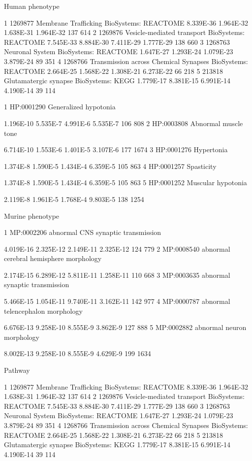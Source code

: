 Human phenotype

1 
1269877 
Membrane Trafficking 
BioSystems: REACTOME 
8.339E-36 
1.964E-32 
1.638E-31 
1.964E-32 
137 
614 
2 
1269876 
Vesicle-mediated transport 
BioSystems: REACTOME 
7.545E-33 
8.884E-30 
7.411E-29 
1.777E-29 
138 
660 
3 
1268763 
Neuronal System 
BioSystems: REACTOME 
1.647E-27 
1.293E-24 
1.079E-23 
3.879E-24 
89 
351 
4 
1268766 
Transmission across Chemical Synapses 
BioSystems: REACTOME 
2.664E-25 
1.568E-22 
1.308E-21 
6.273E-22 
66 
218 
5 
213818 
Glutamatergic synapse 
BioSystems: KEGG 
1.779E-17 
8.381E-15 
6.991E-14 
4.190E-14 
39 
114


1 
HP:0001290 
Generalized hypotonia 

1.196E-10 
5.535E-7 
4.991E-6 
5.535E-7 
106 
808 
2 
HP:0003808 
Abnormal muscle tone 

6.714E-10 
1.553E-6 
1.401E-5 
3.107E-6 
177 
1674 
3 
HP:0001276 
Hypertonia 

1.374E-8 
1.590E-5 
1.434E-4 
6.359E-5 
105 
863 
4 
HP:0001257 
Spasticity 

1.374E-8 
1.590E-5 
1.434E-4 
6.359E-5 
105 
863 
5 
HP:0001252 
Muscular hypotonia 

2.119E-8 
1.961E-5 
1.768E-4 
9.803E-5 
138 
1254


Murine phenotype


1 
MP:0002206 
abnormal CNS synaptic transmission 

4.019E-16 
2.325E-12 
2.149E-11 
2.325E-12 
124 
779 
2 
MP:0008540 
abnormal cerebral hemisphere morphology 

2.174E-15 
6.289E-12 
5.811E-11 
1.258E-11 
110 
668 
3 
MP:0003635 
abnormal synaptic transmission 

5.466E-15 
1.054E-11 
9.740E-11 
3.162E-11 
142 
977 
4 
MP:0000787 
abnormal telencephalon morphology 

6.676E-13 
9.258E-10 
8.555E-9 
3.862E-9 
127 
888 
5 
MP:0002882 
abnormal neuron morphology 

8.002E-13 
9.258E-10 
8.555E-9 
4.629E-9 
199 
1634

Pathway

1 
1269877 
Membrane Trafficking 
BioSystems: REACTOME 
8.339E-36 
1.964E-32 
1.638E-31 
1.964E-32 
137 
614 
2 
1269876 
Vesicle-mediated transport 
BioSystems: REACTOME 
7.545E-33 
8.884E-30 
7.411E-29 
1.777E-29 
138 
660 
3 
1268763 
Neuronal System 
BioSystems: REACTOME 
1.647E-27 
1.293E-24 
1.079E-23 
3.879E-24 
89 
351 
4 
1268766 
Transmission across Chemical Synapses 
BioSystems: REACTOME 
2.664E-25 
1.568E-22 
1.308E-21 
6.273E-22 
66 
218 
5 
213818 
Glutamatergic synapse 
BioSystems: KEGG 
1.779E-17 
8.381E-15 
6.991E-14 
4.190E-14 
39 
114



